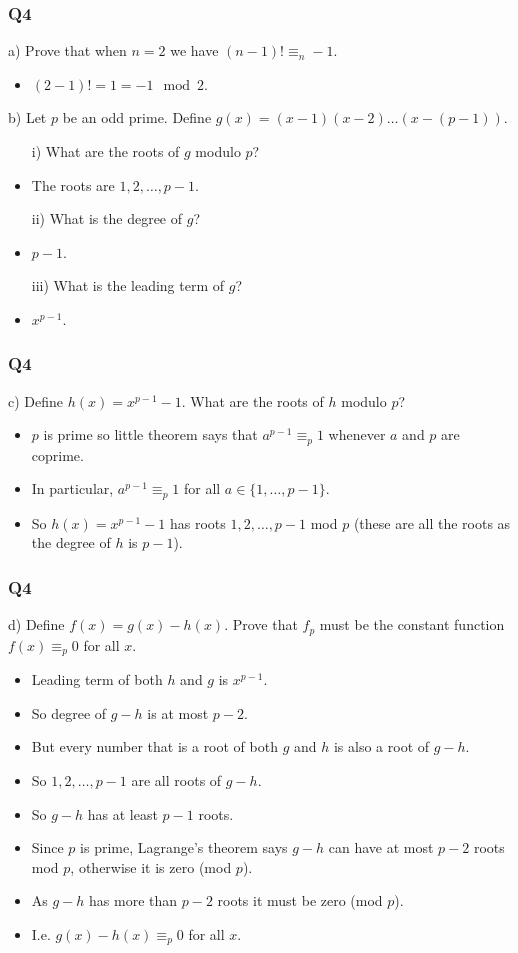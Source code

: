 \documentclass[handout]{beamer}
\begin{document}
\begin{frame}
\frametitle{Q4}
a) Prove that when $n=2$ we have $(n-1)! \equiv_n -1$.
\begin{itemize}
\item $(2-1)! = 1 = -1 \mod 2$.
\end{itemize}
\vspace{1cm}
b) Let $p$ be an odd prime. Define $g(x)= (x-1)(x-2)\ldots(x-(p-1))$.
\begin{itemize}
\item[i)] What are the roots of $g$ modulo $p$?
\item The roots are $1,2,\ldots,p-1$.
\item[ii)] What is the degree of $g$?
\item $p-1$.
\item[iii)] What is the leading term of $g$?
\item $x^{p-1}$.
\end{itemize}
\end{frame}

\begin{frame}
\frametitle{Q4}
c) Define $h(x)= x^{p-1} -1$. What are the roots of $h$ modulo $p$?
\vspace{1cm}
\begin{itemize}
\item $p$ is prime so little theorem says that $a^{p-1} \equiv_p 1$ whenever $a$ and $p$ are coprime.
\vspace{1cm}
\item In particular, $a^{p-1} \equiv_p 1$ for all $a\in\{1,\ldots,p-1\}$.
\vspace{1cm}
\item So $h(x)=x^{p-1} -1$ has roots $1,2,\ldots,p-1$ mod $p$ (these are all the roots as the degree of $h$ is $p-1$).
\end{itemize}
\end{frame}

\begin{frame}
\frametitle{Q4}
d) Define $f(x) = g(x)- h(x)$. Prove that $f_p$ must be the constant function $f(x)\equiv_ p 0$ for all $x$.
\begin{itemize}
\item Leading term of both $h$ and $g$ is $x^{p-1}$.
\item So degree of $g-h$ is at most $p-2$.
\item But every number that is a root of both $g$ and $h$ is also a root of $g-h$.
\item So $1,2,\ldots,p-1$ are all roots of $g-h$.
\item So $g-h$ has at least $p-1$ roots.
\item Since $p$ is prime, Lagrange's theorem says $g-h$ can have at most $p-2$ roots mod $p$, otherwise it is zero (mod $p$).
\item As $g-h$ has more than $p-2$ roots it must be zero (mod $p$).
\item I.e. $g(x)-h(x)\equiv_p 0$ for all $x$.
\end{itemize}
\end{frame}
\end{document}

